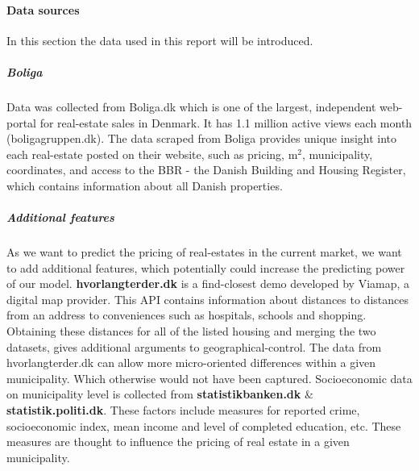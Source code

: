 \documentclass[10pt,a4paper]{report}
\begin{document}
\paragraph{Data sources \newline}
In this section the data used in this report will be introduced. 
\subparagraph{Boliga\newline}
Data was collected from Boliga.dk which is one of the largest, independent web-portal for real-estate sales in Denmark. It has 1.1 million active views each month (boligagruppen.dk). The data scraped from Boliga provides unique insight into each real-estate posted on their website, such as pricing, m$^2$, municipality, coordinates, and access to the BBR - the Danish Building and Housing Register, which contains information about all Danish properties. 
\subparagraph{Additional features\newline}
As we want to predict the pricing of real-estates in the current market, we want to add additional features, which potentially could increase the predicting power of our model. \newline
\textbf{hvorlangterder.dk} is a find-closest demo developed by Viamap, a digital map provider. This API contains information about distances to distances from an address to conveniences such as hospitals, schools and shopping. Obtaining these distances for all of the listed housing
and merging the two datasets, gives additional arguments to geographical-control. The data
from hvorlangterder.dk can allow more micro-oriented differences within a given municipality. Which otherwise would not have been captured.\newline
Socioeconomic data on municipality level is collected from \textbf{statistikbanken.dk} \& \textbf{statistik.politi.dk}. 
These factors include measures for reported crime, socioeconomic index, mean income and level of completed education, etc. These measures are thought to influence the pricing of real estate in a given municipality.
\end{document}
